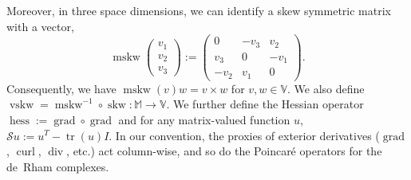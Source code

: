 \documentclass[11pt]{amsart}
\newcommand{\0}{\mathaccent23}
\newcommand\tr{\operatorname{tr}}
\newcommand\skw{\operatorname{skw}}
\newcommand\vskw{\operatorname{vskw}}
\newcommand\mskw{\operatorname{mskw}}
\newcommand\sym{\operatorname{sym}}
\newcommand\grad{\operatorname{grad}}
\renewcommand\div{\operatorname{div}}
\newcommand\curl{\operatorname{curl}}
\newcommand\dev{\mathrm{dev}}
\newcommand\hess{\operatorname{hess}}
\newcommand\K{\mathbb{K}}
\newcommand\M{\mathbb{M}}
\renewcommand\S{{\mathbb S}}
\newcommand\R{\mathbb{R}}
\newcommand\V{{\mathbb{V}}}
\begin{document}
Moreover, in three space dimensions, we can identify a skew symmetric matrix with a vector,
$$
 \mskw\left ( 
\begin{array}{c}
v_{1}\\ v_{2}\\ v_{3}
\end{array}
\right ):= \left ( 
\begin{array}{ccc}
0 & -v_{3} & v_{2} \\
v_{3} & 0 & -v_{1}\\
-v_{2} & v_{1} & 0
\end{array}
\right ).
$$
Consequently, we have   $\mskw(v)w = v\times w$ for $v,w\in\V$.  We also define
$\vskw=\mskw^{-1}\circ \skw: \M\to \V$. We further define the Hessian operator $\hess:=\grad\circ\grad$ and for any matrix-valued function $u$, $\mathcal{S}u:=u^{T}-\tr(u)I$. In our convention, the proxies of exterior derivatives ($\grad$, $\curl$, $\div$, etc.) act column-wise, and so do the Poincar\'e operators for the de~Rham complexes.
\end{document}
